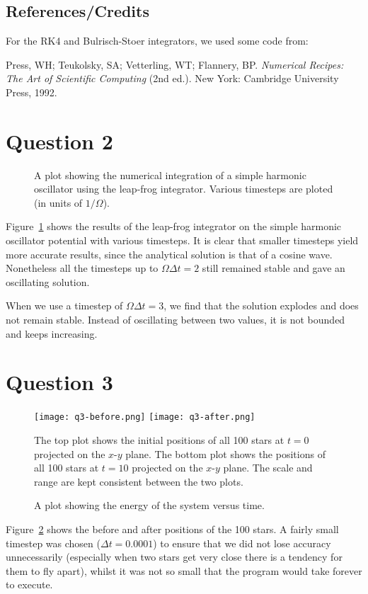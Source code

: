 \documentclass[11pt]{article}
\begin{document}
\subsection{References/Credits}
For the RK4 and Bulrisch-Stoer integrators, we used some code from:

Press, WH; Teukolsky, SA; Vetterling, WT; Flannery, BP. \emph{Numerical Recipes: The Art of Scientific Computing} (2nd ed.). New York: Cambridge University Press, 1992.

\section{Question 2}
\begin{figure}
  \centering
\resizebox{0.6\textwidth}{!}{}
  \caption{A plot showing the numerical integration of a simple harmonic oscillator using the leap-frog integrator. Various timesteps are ploted (in units of $1/\Omega$).}
  \label{q2-plot}
\end{figure}
Figure~\ref{q2-plot} shows the results of the leap-frog integrator on the simple harmonic oscillator potential with various timesteps. It is clear that smaller timesteps yield more accurate results, since the analytical solution is that of a cosine wave. Nonetheless all the timesteps up to $\Omega \Delta t = 2$ still remained stable and gave an oscillating solution.

When we use a timestep of $\Omega \Delta t = 3$, we find that the solution explodes and does not remain stable. Instead of oscillating between two values, it is not bounded and keeps increasing.

\section{Question 3}
\begin{figure}
  \centering
  {\texttt{[image: q3-before.png]}}                
  {\texttt{[image: q3-after.png]}}
  \caption{The top plot shows the initial positions of all 100 stars at $t=0$ projected on the $x$-$y$ plane. The bottom plot shows the positions of all 100 stars at $t=10$ projected on the $x$-$y$ plane. The scale and range are kept consistent between the two plots.}
  \label{q3-plot}
\end{figure}
\begin{figure}
  \centering
\resizebox{0.6\textwidth}{!}{}
  \caption{A plot showing the energy of the system versus time.}
  \label{q3-energy}
\end{figure}
Figure~\ref{q3-plot} shows the before and after positions of the 100 stars. A fairly small timestep was chosen ($\Delta t = 0.0001$) to ensure that we did not lose accuracy unnecessarily (especially when two stars get very close there is a tendency for them to fly apart), whilst it was not so small that the program would take forever to execute.
\end{document}
